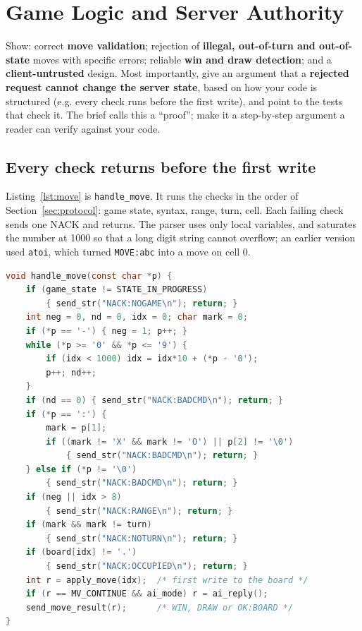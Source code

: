\section{Game Logic and Server Authority}
\label{sec:authority}

\begin{guidance}
Show: correct \textbf{move validation}; rejection of \textbf{illegal,
out-of-turn and out-of-state} moves with specific errors; reliable
\textbf{win and draw detection}; and a \textbf{client-untrusted} design. Most
importantly, give an argument that a \textbf{rejected request cannot change the
server state}, based on how your code is structured (e.g. every check runs
before the first write), and point to the tests that check it. The brief calls
this a ``proof''; make it a step-by-step argument a reader can verify against
your code.
\end{guidance}

\subsection{Every check returns before the first write}
Listing~\ref{lst:move} is \texttt{handle\_move}. It runs the checks in the
order of Section~\ref{sec:protocol}: game state, syntax, range, turn, cell. Each
failing check sends one NACK and returns. The parser uses only local variables,
and saturates the number at 1000 so that a long digit string cannot overflow;
an earlier version used \texttt{atoi}, which turned \texttt{MOVE:abc} into a
move on cell 0.

\begin{lstlisting}[float=tp, language=C, caption={Move validation (\texttt{main.c}, trimmed).}, label=lst:move]
void handle_move(const char *p) {
    if (game_state != STATE_IN_PROGRESS)
        { send_str("NACK:NOGAME\n"); return; }
    int neg = 0, nd = 0, idx = 0; char mark = 0;
    if (*p == '-') { neg = 1; p++; }
    while (*p >= '0' && *p <= '9') {
        if (idx < 1000) idx = idx*10 + (*p - '0');
        p++; nd++;
    }
    if (nd == 0) { send_str("NACK:BADCMD\n"); return; }
    if (*p == ':') {
        mark = p[1];
        if ((mark != 'X' && mark != 'O') || p[2] != '\0')
            { send_str("NACK:BADCMD\n"); return; }
    } else if (*p != '\0')
        { send_str("NACK:BADCMD\n"); return; }
    if (neg || idx > 8)
        { send_str("NACK:RANGE\n"); return; }
    if (mark && mark != turn)
        { send_str("NACK:NOTURN\n"); return; }
    if (board[idx] != '.')
        { send_str("NACK:OCCUPIED\n"); return; }
    int r = apply_move(idx);  /* first write to the board */
    if (r == MV_CONTINUE && ai_mode) r = ai_reply();
    send_move_result(r);      /* WIN, DRAW or OK:BOARD */
}
\end{lstlisting}


